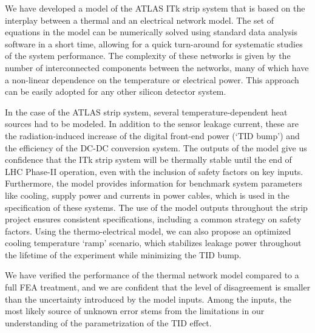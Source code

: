 We have developed a model of the ATLAS ITk strip system that is based on the interplay between a thermal and an electrical network model. The set of equations in the model can be numerically solved using standard data analysis software in a short time, allowing for a quick turn-around for systematic studies of the system performance. The complexity of these networks is given by the number of interconnected components between the networks, many of which have a non-linear dependence on the temperature or electrical power. This approach can be easily adopted for any other silicon detector system.

In the case of the ATLAS strip system, several temperature-dependent heat sources had to be modeled. In addition to the sensor leakage current, these are the  radiation-induced increase of the digital front-end power (`TID bump') and the efficiency of the DC-DC conversion system. The outputs of the model give us confidence that the ITk strip system will be thermally stable until the end of LHC Phase-II operation, even with the inclusion of safety factors on key inputs. Furthermore, the model provides information for benchmark system parameters like cooling, supply power and currents in power cables, which is used in the specification of these systems. The use of the model outputs throughout the strip project ensures consistent specifications, including a common strategy on safety factors. Using the thermo-electrical model, we can also propose an optimized cooling temperature `ramp' scenario, which stabilizes leakage power throughout the lifetime of the experiment while minimizing the TID bump.

We have verified the performance of the thermal network model compared to a full FEA treatment, and we are confident that the level of disagreement is smaller than the uncertainty introduced by the model inputs. Among the inputs, the most likely source of unknown error stems from the limitations in our understanding of the parametrization of the TID effect.
